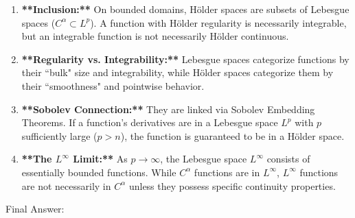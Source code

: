 \documentclass[12pt,a4paper]{report}
\begin{document}
\begin{description}
\begin{enumerate}

	\item \textbf{**Inclusion:**} On bounded domains, Hölder spaces are subsets of Lebesgue spaces ($C^\alpha \subset L^p$). A function with Hölder regularity is necessarily integrable, but an integrable function is not necessarily Hölder continuous.
	
	\item \textbf{**Regularity vs. Integrability:**} Lebesgue spaces categorize functions by their ``bulk" size and integrability, while Hölder spaces categorize them by their ``smoothness" and pointwise behavior.
	
	\item  \textbf{**Sobolev Connection:**} They are linked via Sobolev Embedding Theorems. If a function's derivatives are in a Lebesgue space $L^p$ with $p$ sufficiently large ($p > n$), the function is guaranteed to be in a Hölder space.
	
	\item \textbf{**The $L^\infty$ Limit:**} As $p \to \infty$, the Lebesgue space $L^\infty$ consists of essentially bounded functions. While $C^\alpha$ functions are in $L^\infty$, $L^\infty$ functions are not necessarily in $C^\alpha$ unless they possess specific continuity properties.
\end{enumerate}

Final Answer:


\end{description}
\end{document}

